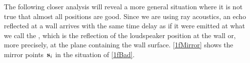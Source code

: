 \documentclass[reqno]{amsart}
\begin{document}


The following closer analysis will reveal a more general situation where it is not true that almost all positions are good. Since we are using ray acoustics, an echo reflected at a wall arrives
with the same time delay as if it were emitted at what we call the
, which is the reflection of the loudspeaker position
at the wall or, more precisely, at the plane containing the wall
surface. \cref{1fMirror} shows the mirror points~$\mathbf{s}_i$ in the situation of
\cref{1fBad}.
\end{document}
